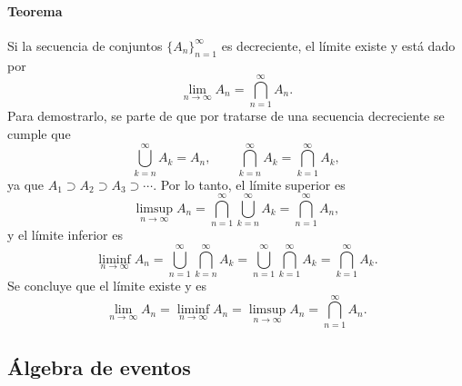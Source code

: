 \documentclass[a4paper]{report}
\begin{document}
\paragraph{Teorema} Si la secuencia de conjuntos \(\{A_n\}_{n=1}^{\infty}\) es decreciente, el límite existe y está dado por
\begin{equation}\label{eq:decreasing_sequence_limit}
 \lim_{n\to\infty} A_n = \bigcap_{n=1}^{\infty}A_n.
\end{equation}
Para demostrarlo, se parte de que por tratarse de una secuencia decreciente se cumple que
\[
 \bigcup_{k=n}^{\infty}A_k=A_n,\qquad\bigcap_{k=n}^{\infty}A_k=\bigcap_{k=1}^{\infty}A_k,
\]
ya que \(A_1\supset A_2\supset A_3\supset\cdots\). Por lo tanto, el límite superior es
\[
 \limsup_{n\rightarrow \infty }A_n=\bigcap_{n=1}^{\infty }\bigcup_{k=n}^{\infty }A_k=\bigcap_{n=1}^{\infty }A_n,
\]
y el límite inferior es
 \[
 \liminf_{n\rightarrow \infty }A_n=\bigcup_{n=1}^{\infty }\bigcap_{k=n}^{\infty }A_k=\bigcup_{n=1}^{\infty }\bigcap_{k=1}^{\infty }A_k=\bigcap_{k=1}^{\infty }A_k.
\]
Se concluye que el límite existe y es
\[
 \lim_{n\to\infty} A_n = \liminf_{n\rightarrow \infty }A_n = \limsup_{n\rightarrow \infty }A_n=\bigcap_{n=1}^{\infty }A_n.
\]

\subsection{Álgebra de eventos}
\end{document}
